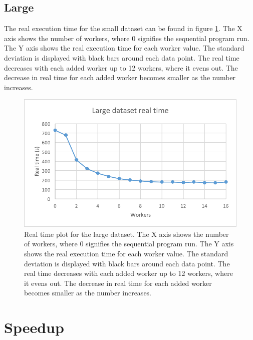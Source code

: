 \subsection{Large}
The real execution time for the small dataset can be found in figure \ref{fig:dataset_4_real_time}.
The X axis shows the number of workers, where 0 signifies the sequential program run.
The Y axis shows the real execution time for each worker value. The standard deviation is displayed with black bars around each data point. The real time
decreases with each added worker up to 12 workers, where it evens out. The decrease in real time for each added worker becomes smaller as the number increases.
\begin{figure}[ht]
  \centering
  \includegraphics[width=120mm]{figures/dataset_4/dataset_4_real_time.png}
  \caption[Real time plot for the large dataset.]{Real time plot for the large dataset. The X axis shows the number of workers, where 0 signifies the sequential program run.
  The Y axis shows the real execution time for each worker value. The standard deviation is displayed with black bars around each data point. The real time
  decreases with each added worker up to 12 workers, where it evens out. The decrease in real time for each added worker becomes smaller as the number increases.}
  \label{fig:dataset_4_real_time}
\end{figure}

\section{Speedup}

